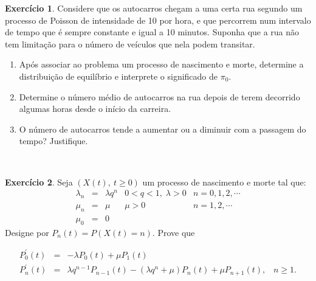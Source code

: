 \documentclass[
  11pt,
  a4paper,
]{book}
\theoremstyle{definition}
\theoremstyle{definition}
\theoremstyle{definition}
\newtheorem{exercise}{Exercício}[chapter]
\theoremstyle{definition}
\theoremstyle{remark}
\begin{document}
\begin{exercise}
\leavevmode

Considere que os autocarros chegam a uma certa rua segundo um processo de Poisson de intensidade de 10 por hora, e que percorrem num intervalo de tempo que é sempre constante e igual a 10 minutos. Suponha que a rua não tem limitação para o número de veículos que nela podem transitar.

\begin{enumerate}
\def\labelenumi{\alph{enumi})}
\item
  Após associar ao problema um processo de nascimento e morte, determine a distribuição de equilíbrio e interprete o significado de \(\pi_0\).
\item
  Determine o número médio de autocarros na rua depois de terem decorrido algumas horas desde o início da carreira.
\item
  O número de autocarros tende a aumentar ou a diminuir com a passagem do tempo? Justifique.
\end{enumerate}

\end{exercise}

\(\,\)

\begin{exercise}
\leavevmode

Seja \((X(t), ~t\geq 0)\) um processo de nascimento e morte tal que:
\[
\begin{array}{rclcc}
\lambda _{n} & = & \lambda q^{n} & 0<q<1,\;\lambda >0 & n=0,1,2,\cdots \\
\mu _{n} & = & \mu & \mu >0 & n=1,2,\cdots \\
\mu _{0} & = & 0 &  & \
\end{array}
\]
Designe por \(P_{n}(t)=P(X(t)=n)\). Prove que

\begin{eqnarray*}
P_{0}^{\prime }(t) &=&-\lambda P_{0}(t)+\mu P_{1}(t) \\
P_{n}^{\prime }(t) &=&\lambda q^{n-1}P_{n-1}(t)-(\lambda q^{n}+\mu
)P_{n}(t)+\mu P_{n+1}(t),\;\;\;n\geq 1.
\end{eqnarray*}

\end{exercise}

\(\,\)
\end{document}
